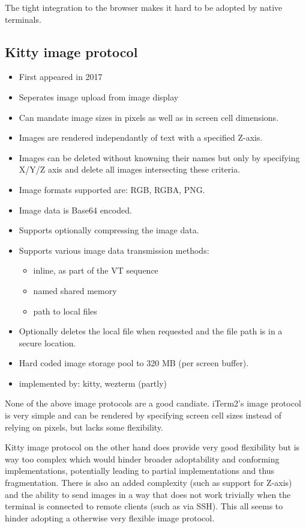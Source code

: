 \documentclass[a4paper]{article}
\begin{document}
The tight integration to the browser makes it hard to be adopted by native
terminals.

\subsection{Kitty image protocol}

\begin{itemize}
    \item First appeared in 2017
    \item Seperates image upload from image display
    \item Can mandate image sizes in pixels as well as in screen cell dimensions.
    \item Images are rendered independantly of text with a specified Z-axis.
    \item Images can be deleted without knowning their names but only by specifying X/Y/Z axis
          and delete all images intersecting these criteria.
    \item Image formats supported are: RGB, RGBA, PNG.
    \item Image data is Base64 encoded.
    \item Supports optionally compressing the image data.
    \item Supports various image data transmission methods:
        \begin{itemize}
            \item inline, as part of the VT sequence
            \item named shared memory
            \item path to local files
        \end{itemize}
    \item Optionally deletes the local file when requested and the file path is in a secure location.
    \item Hard coded image storage pool to 320 MB (per screen buffer).
    \item implemented by: kitty, wezterm (partly)
\end{itemize}

None of the above image protocols are a good candiate. iTerm2's image protocol is very simple and
can be rendered by specifying screen cell sizes instead of relying on pixels, but lacks some
flexibility.

Kitty image protocol on the other hand does provide very good flexibility but is way too complex which
would hinder broader adoptability and conforming implementations, potentially leading to partial
implementations and thus fragmentation.
There is also an added complexity (such as support for Z-axis) and the ability
to send images in a way that does not work trivially when the terminal is
connected to remote clients (such as via SSH). This all seems to hinder
adopting a otherwise very flexible image protocol.
\end{document}
